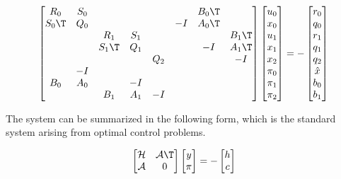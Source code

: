 \[
\begin{bmatrix}
    R_0   & S_0 &       &     &     &       & B_0\T &       \\
    S_0\T & Q_0 &       &     &     & -I    & A_0\T &       \\
          &     & R_1   & S_1 &     &       &       & B_1\T \\
          &     & S_1\T & Q_1 &     &       & -I    & A_1\T \\
          &     &       &     & Q_2 &       &       & -I    \\
          & -I  &       &     &     &       &       &       \\
    B_0   & A_0 &       & -I  &     &       &       &       \\
          &     & B_1   & A_1 & -I  &       &       &       \\
\end{bmatrix}
\begin{bmatrix}
        u_0 \\ x_0 \\ u_1 \\ x_1 \\ x_2 \\ \pi_0 \\ \pi_1 \\ \pi_2
\end{bmatrix}
= 
-\begin{bmatrix}
    r_0 \\ q_0 \\ r_1 \\ q_1 \\ q_2 \\ \hat{x} \\ b_0 \\ b_1
\end{bmatrix}
\]

The system can be summarized in the following form, which is the standard system arising from optimal control problems.

\[
\begin{bmatrix} \mathcal{H}  & \mathcal{A} \T \\ \mathcal{A}  & 0 \end{bmatrix} \begin{bmatrix} y \\ \pi \end{bmatrix} = -\begin{bmatrix} h \\ c \end{bmatrix}
\]

